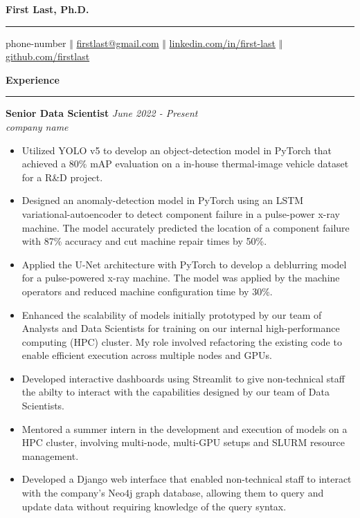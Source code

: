 \documentclass[11pt]{article}
\begin{document}
\thispagestyle{empty}

\begin{center}
  \bf \Huge  First Last, Ph.D.
  \vspace{.1em}
  \hrule
\end{center}

\begin{center}
  \vspace{.4em}
  phone-number $\Big \Vert$
  \href{mailto:firstlast@gmail.com}{firstlast@gmail.com} $\Big \Vert$ 
  \href{https://www.linkedin.com/in/first-last/}{linkedin.com/in/first-last} $\Big \Vert$
  \href{https://github.com/firstlast}{github.com/firstlast}
\end{center}

\textbf{\Large Experience}
\vspace{.3em}
\hrule
\vspace{.3em}

\textbf{\large Senior Data Scientist} \hfill \textit{June 2022 - Present}\\
\textit{company name} 

\begin{itemize} \setlength\itemsep{0em}
  \item Utilized YOLO v5 to develop an object-detection model in PyTorch that achieved a 
    80\% mAP evaluation on a in-house thermal-image vehicle dataset for a R\&D project. 

  \item Designed an anomaly-detection model in PyTorch using an LSTM 
    variational-autoencoder to detect component failure in a pulse-power x-ray 
    machine. The model accurately predicted the location of a component failure with 
    87\% accuracy and cut machine repair times by 50\%.

  \item Applied the U-Net architecture with PyTorch to develop a deblurring model for 
    a pulse-powered x-ray machine. The model was applied by the machine operators 
    and reduced machine configuration time by 30\%.

  \item Enhanced the scalability of models initially prototyped by our team of Analysts 
    and Data Scientists for training on our internal high-performance computing (HPC) 
    cluster. My role involved refactoring the existing code to enable efficient 
    execution across multiple nodes and GPUs.

  \item Developed interactive dashboards using Streamlit to give non-technical staff the
    abilty to interact with the capabilities designed by our team of Data Scientists.

  \item Mentored a summer intern in the development and execution of models on a 
    HPC cluster, involving multi-node, multi-GPU setups and SLURM resource management.

  \item Developed a Django web interface that enabled non-technical staff to 
    interact with the company's Neo4j graph database, allowing them to query and 
    update data without requiring knowledge of the query syntax.
\end{itemize}
\end{document}

